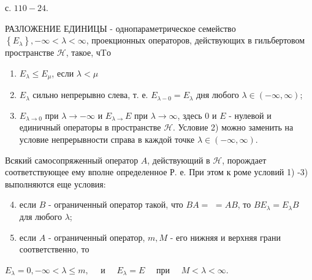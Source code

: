 \documentclass[10pt]{article}
\begin{document}
с. $110-24$.



РАЗЛОЖЕНИЕ ЕДИНИЦЫ - однопараметрическое семейство $\left\{E_{\lambda}\right\},-\infty<\lambda<\infty$, проекционных операторов, действующих в гильбертовом пространстве $\mathscr{H}$, такое, чTо



\begin{enumerate}

  \item $E_{\lambda} \leqslant E_{\mu}$, если $\lambda<\mu$



  \item $E_{\lambda}$ сильно непрерывно слева, т. е. $E_{\lambda-0}=E_{\lambda}$ дня любого $\lambda \in(-\infty, \infty)$;



  \item $E_{\lambda \rightarrow 0}$ при $\lambda \rightarrow-\infty$ и $E_{\lambda \rightarrow} E$ при $\lambda \rightarrow \infty$, здесь 0 и $E$ - нулевой и единичный операторы в пространстве $\mathscr{H}$. Условие 2) можно заменить на условие непрерывности справа в каждой точке $\lambda \in(-\infty, \infty)$.



\end{enumerate}



Всякий самосопряженный оператор $A$, действующий в $\mathscr{H}$, порождает соответствующее ему вполне определенное Р. е. При этом к роме условий 1) -3) выполняются еще условия:



\begin{enumerate}

  \setcounter{enumi}{3}

  \item если $B$ - ограниченный оператор такой, что $B A=$ $=A B$, то $B E_{\lambda}=E_{\lambda} B$ для любого $\lambda$;



  \item если $A$ - ограниченный оператор, $m, M$ - его нижняя и верхняя грани соответственно, то



\end{enumerate}



$E_{\lambda}=0,-\infty<\lambda \leqslant m, \quad$ и $\quad E_{\lambda}=E \quad$ при $\quad M<\lambda<\infty$.
\end{document}
